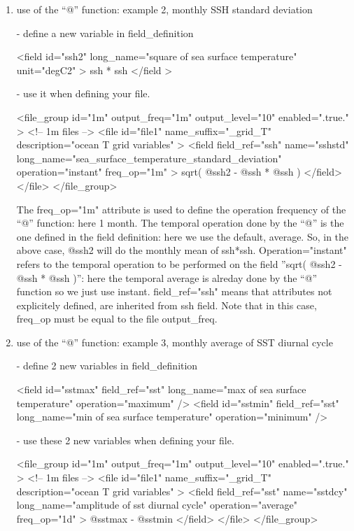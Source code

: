 \documentclass[../main/NEMO_manual]{subfiles}
\begin{document}
\begin{enumerate}
\item use of the ``@'' function: example 2, monthly SSH standard deviation

 - define a new variable in field\_definition

\begin{xmllines}
<field id="ssh2" long_name="square of sea surface temperature" unit="degC2" > ssh * ssh </field >
\end{xmllines}

 - use it when defining your file.

\begin{xmllines}
<file_group id="1m" output_freq="1m"  output_level="10" enabled=".true." >  <!-- 1m files -->
	<file id="file1" name_suffix="_grid_T" description="ocean T grid variables" >
		<field field_ref="ssh" name="sshstd" long_name="sea_surface_temperature_standard_deviation"
		operation="instant" freq_op="1m" >
			sqrt( @ssh2 - @ssh * @ssh )
		</field>
	</file>
</file_group>
\end{xmllines}

The freq\_op="1m" attribute is used to define the operation frequency of the ``@'' function: here 1 month.
The temporal operation done by the ``@'' is the one defined in the field definition:
here we use the default, average.
So, in the above case, @ssh2 will do the monthly mean of ssh*ssh.
Operation="instant" refers to the temporal operation to be performed on the field ''sqrt( @ssh2 - @ssh * @ssh )'':
here the temporal average is alreday done by the ``@'' function so we just use instant.
field\_ref="ssh" means that attributes not explicitely defined, are inherited from ssh field.
Note that in this case, freq\_op must be equal to the file output\_freq.

\item use of the ``@'' function: example 3, monthly average of SST diurnal cycle

 - define 2 new variables in field\_definition

\begin{xmllines}
<field id="sstmax" field_ref="sst" long_name="max of sea surface temperature" operation="maximum" />
<field id="sstmin" field_ref="sst" long_name="min of sea surface temperature" operation="minimum" />
\end{xmllines}

 - use these 2 new variables when defining your file.

\begin{xmllines}
<file_group id="1m" output_freq="1m"  output_level="10" enabled=".true." >  <!-- 1m files -->
	<file id="file1" name_suffix="_grid_T" description="ocean T grid variables" >
		<field field_ref="sst" name="sstdcy" long_name="amplitude of sst diurnal cycle" operation="average" freq_op="1d" >
			@sstmax - @sstmin
		</field>
	</file>
</file_group>
\end{xmllines}

\end{enumerate}
\end{document}
